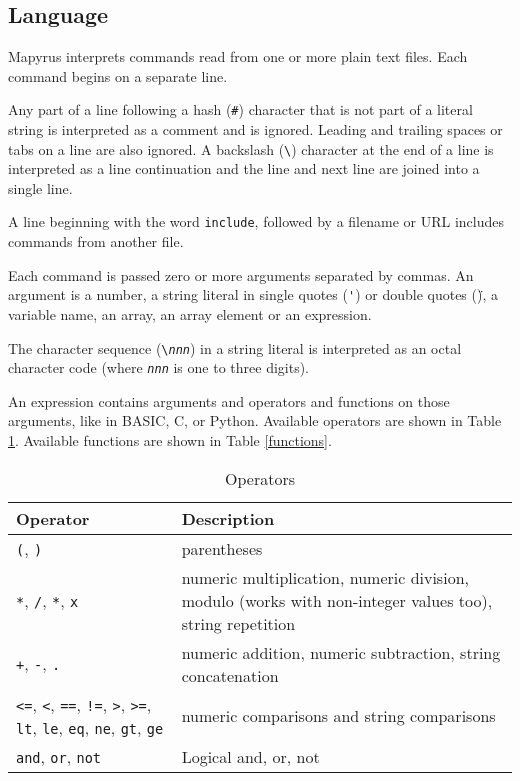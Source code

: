 \subsection{Language}

Mapyrus interprets commands read from one or more plain text files.
Each command begins on a separate line.

Any part of a line following a hash (\texttt{\#}) character that is not part of
a literal string is interpreted as a comment and is ignored.  Leading and
trailing spaces or tabs on a line are also ignored.  A backslash
(\texttt{\textbackslash}) character at the end of a line is interpreted as a
line continuation and the line and next line are joined into a single line.

A line beginning with the word \texttt{include}, followed by a filename
or URL includes commands from another file.

Each command is passed zero or more arguments separated by commas.
An argument is a number, a string literal in single quotes (\texttt{\'})
or double quotes (\texttt{\"}), a variable name, an array, an
array element or an expression.

The character sequence (\texttt{\textbackslash{}\textit{nnn}}) in
a string literal is interpreted as an octal character code (where
\texttt{\textit{nnn}} is one to three digits).

An expression contains arguments and operators and functions
on those arguments, like in BASIC, C, or Python.
Available operators are shown in Table \ref{operators}.
Available functions are shown in Table \ref{functions}.


\begin{table}[htb]
\begin{tabular}{|l|p{7cm}|}
\hline
Operator & Description \\
\hline
\hline

\texttt{(}, \texttt{)} & parentheses \\

\hline

\texttt{*}, \texttt{/}, \texttt{*}, \texttt{x} &
numeric multiplication, numeric division, modulo (works
with non-integer values too), string repetition \\

\hline

\texttt{+}, \texttt{-}, \texttt{.} & numeric addition,
numeric subtraction, string concatenation \\

\hline

\texttt{<=}, \texttt{<}, \texttt{==},
\texttt{!=}, \texttt{>}, \texttt{>=},
\texttt{lt}, \texttt{le}, \texttt{eq},
\texttt{ne}, \texttt{gt}, \texttt{ge} &
numeric comparisons and string comparisons \\

\hline

\texttt{and},
\texttt{or},
\texttt{not} &
Logical and, or, not \\

\hline

\end{tabular}
\caption{Operators}
\label{operators}
\end{table}


